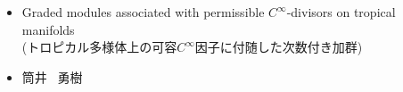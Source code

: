 \documentclass[uplatex,dvipdfmx,12pt]{jsarticle}
\begin{document}
\begin{titlepage}


\fontsize{20pt}{0cm}\selectfont

\begin{center}
\end{center}

\vspace{3cm}

\fontsize{14pt}{14pt}\selectfont

\begin{itemize}
\setlength{\leftskip}{34pt}
\item[{\textmc{論文題目}\quad}] Graded modules associated 
with permissible $C^{\infty}$-divisors on tropical manifolds \\
(トロピカル多様体上の可容$C^{\infty}$因子に付随した次数付き加群)
\end{itemize}

\vspace{3cm}

\begin{itemize}
\setlength{\leftskip}{34pt}
\item[{\textmc{氏 \quad 名 }\quad}]  筒井 \, 勇樹
\end{itemize}

\end{titlepage}
\end{document}
